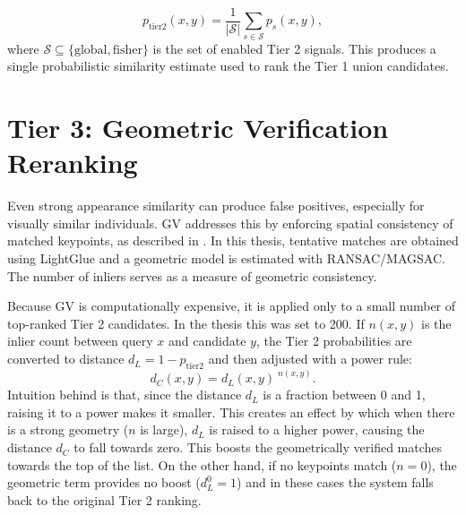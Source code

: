 \begin{equation}
    p_{\text{tier2}}(x,y) = \frac{1}{|\mathcal{S}|}\sum_{s \in \mathcal{S}} p_s(x,y),
\end{equation}
where $\mathcal{S} \subseteq \{\text{global}, \text{fisher}\}$ is the set of enabled Tier 2 signals.
This produces a single probabilistic similarity estimate used to rank the Tier 1 union candidates.

\section{Tier 3: Geometric Verification Reranking}
\label{sec:class_tier3}
Even strong appearance similarity can produce false positives, especially for visually similar individuals. GV addresses this by enforcing spatial consistency of matched keypoints, as described in \cite{springerSpeciesAgnosticPatterned}. In this thesis, tentative matches are obtained using LightGlue and a geometric model is estimated with RANSAC/MAGSAC. The number of inliers serves as a measure of geometric consistency.

Because GV is computationally expensive, it is applied only to a small number of top-ranked Tier 2 candidates. In the thesis this was set to \num{200}. 
If $n(x,y)$ is the inlier count between query $x$ and candidate $y$, the Tier 2 probabilities are converted to distance $d_L = 1 - p_{\text{tier2}}$ and then adjusted with a power rule\cite{springerSpeciesAgnosticPatterned}:
\begin{equation}
    d_C(x,y) = d_L(x,y)^{\;n(x,y)}.
\end{equation}
Intuition behind is that, since the distance $d_L$ is a fraction between 0 and 1, raising it to a power makes it smaller. This creates an effect by which when there is a strong geometry ($n$ is large), $d_L$ is raised to a higher power, causing the distance $d_C$ to fall towards zero. This boosts the geometrically verified matches towards the top of the list. On the other hand, if no keypoints match ($n=0$), the geometric term provides no boost ($d_L^0 = 1$) and in these cases the system falls back to the original Tier 2 ranking.

